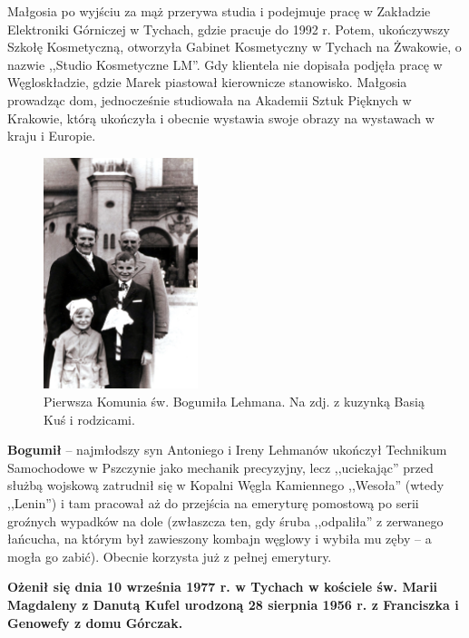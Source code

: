 Małgosia po wyjściu za mąż przerywa studia i podejmuje pracę w Zakładzie Elektroniki Górniczej w Tychach, gdzie pracuje do 1992 r. Potem, ukończywszy Szkołę Kosmetyczną, otworzyła Gabinet Kosmetyczny w Tychach na Żwakowie, o nazwie ,,Studio Kosmetyczne LM''. Gdy klientela nie dopisała podjęła pracę w Węgloskładzie, gdzie Marek piastował kierownicze stanowisko. Małgosia prowadząc dom,  jednocześnie studiowała na Akademii Sztuk Pięknych w Krakowie, którą ukończyła i obecnie wystawia swoje obrazy na wystawach w kraju i Europie.

\begin{figure}[!h]
\begin{center}
\includegraphics[width=0.4\textwidth]{photo/bogumil_lehman_komunia.jpg}
\caption[Pierwsza Komunia św. Bogumiła Lehmana]{Pierwsza Komunia św. Bogumiła Lehmana. Na zdj. z kuzynką Basią Kuś i rodzicami.}
\end{center}
\end{figure}

\textbf{Bogumił} -- najmłodszy syn Antoniego i Ireny Lehmanów ukończył Technikum Samochodowe w Pszczynie jako mechanik precyzyjny, lecz ,,uciekając'' przed służbą wojskową zatrudnił się w Kopalni Węgla Kamiennego ,,Wesoła'' (wtedy ,,Lenin'') i tam pracował aż do przejścia na emeryturę pomostową po serii groźnych wypadków na dole (zwłaszcza ten, gdy śruba ,,odpaliła'' z zerwanego łańcucha, na którym był zawieszony kombajn węglowy i wybiła mu zęby -- a mogła go zabić). Obecnie korzysta już z pełnej emerytury. 

\textbf{Ożenił się dnia 10 września 1977 r. w Tychach w kościele św. Marii Magdaleny z Danutą Kufel urodzoną 28 sierpnia 1956 r. z Franciszka i Genowefy z domu Górczak.}

